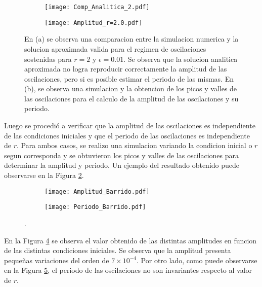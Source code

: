 \begin{figure}
    \centering
    \begin{subfigure}[b]{0.48\textwidth}
        \texttt{[image: Comp\_Analitica\_2.pdf]}
        \caption{}
        \label{02_Comp_Analitica}
    \end{subfigure}
    \hfill
    \begin{subfigure}[b]{0.48\textwidth}
        \texttt{[image: Amplitud\_r=2.0.pdf]}
        \caption{}
        \label{02_Picos}
    \end{subfigure}
    \caption{En (a) se observa una comparacion entre la simulacion numerica y la solucion aproximada valida para el regimen de oscilaciones sostenidas para $r=2$ y $\epsilon=0.01$. Se observa que la solucion analitica aproximada no logra reproducir correctamente la amplitud de las oscilaciones, pero si es posible estimar el periodo de las mismas. En (b), se observa una simulacion y la obtencion de los picos y valles de las oscilaciones para el calculo de la amplitud de las oscilaciones y su periodo.}
    \label{02_ejercicio}
\end{figure}

Luego se procedió a verificar que la amplitud de las oscilaciones es independiente de las condiciones iniciales y que el periodo de las oscilaciones es independiente de $r$. Para ambos casos, se realizo una simulacion variando la condicion inicial o $r$ segun corresponda y se obtuvieron los picos y valles de las oscilaciones para determinar la amplitud y periodo. Un ejemplo del resultado obtenido puede observarse en la Figura \ref{02_Picos}.

\begin{figure}
    \centering
    \begin{subfigure}[b]{0.48\textwidth}
        \texttt{[image: Amplitud\_Barrido.pdf]}
        \caption{}
        \label{02_Barrido_CI}
    \end{subfigure}
    \hfill
    \begin{subfigure}[b]{0.48\textwidth}
        \texttt{[image: Periodo\_Barrido.pdf]}
        \caption{}
        \label{02_Barrido_r}
    \end{subfigure}
    \caption{.}
    \label{02_Resutados_Barridos}
\end{figure}

En la Figura \ref{02_Barrido_CI} se observa el valor obtenido de las distintas amplitudes en funcion de las distintas condiciones iniciales. Se observa que la amplitud presenta pequeñas variaciones del orden de $7\times 10^{-4}$. Por otro lado, como puede observarse en la Figura \ref{02_Barrido_r}, el periodo de las oscilaciones no son invariantes respecto al valor de $r$.